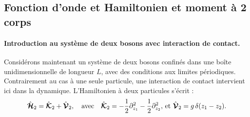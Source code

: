 %
%
%

\subsection{Fonction d’onde et Hamiltonien et moment à 2 corps}

\paragraph{Introduction au système de deux bosons avec interaction de contact.}

Considérons maintenant un système de deux bosons confinés dans une boîte unidimensionnelle de longueur \(L\), avec des conditions aux limites périodiques. Contrairement au cas à une seule particule, une interaction de contact intervient ici dans la dynamique. L’Hamiltonien à deux particules s’écrit :
\begin{eqnarray}
	\hat{\bm{\mathcal{H}}}_2 = \hat{\bm{\mathcal{K}}}_2 + \hat{\bm{\mathcal{V}}}_2, \quad \text{avec} \quad \hat{\bm{\mathcal{K}}}_2 = - \frac{1}{2} \partial_{z_1}^2 - \frac{1}{2} \partial_{z_2}^2, \, \text{et} \,\, \hat{\bm{\mathcal{V}}}_2 = g \, \delta(z_1 - z_2). \label{chap:1:hal.mod.2.part.3}
\end{eqnarray}

